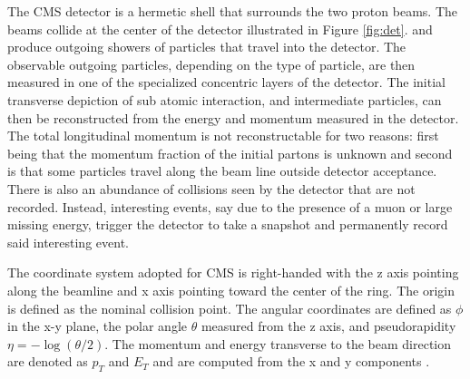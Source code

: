 The CMS detector is a hermetic shell that surrounds the two proton beams. The beams collide at the center of the detector illustrated in Figure \ref{fig:det}. and produce outgoing showers of particles that travel into the detector. The observable outgoing particles, depending on the type of particle, are then measured in one of the specialized concentric layers of the detector. The initial transverse depiction of sub atomic interaction, and intermediate particles, can then be reconstructed from the energy and momentum measured in the detector. The total longitudinal momentum is not reconstructable for two reasons: first being that the momentum fraction of the initial partons is unknown and second is that some particles travel along the beam line outside detector acceptance.  There is also an abundance of collisions seen by the detector that are not recorded. Instead, interesting events, say due to the presence of a muon or large missing energy, trigger the detector to take a snapshot and permanently record said interesting event.

The coordinate system adopted for CMS is right-handed with the z axis pointing along the beamline and x axis pointing toward the center of the ring. The origin is defined as the nominal collision point. The angular coordinates are defined as $\phi$ in the x-y plane, the polar angle $\theta$ measured from the z axis, and pseudorapidity $\eta =-\log(\theta/2)$. The momentum and energy transverse to the beam direction are denoted as $p_T$ and $E_T$ and are computed from the x and y components \cite{CMS:2017lum}. 


